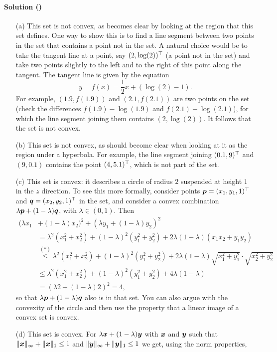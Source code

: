\documentclass{article}
\newcounter{problems}
\renewcommand{\solution}[1]{\paragraph{Solution (\theproblems)}\addtocounter{problems}{1}\label{#1}}
\begin{document}
\solution{so3} 
\begin{itemize}
 \item[(a)] This set is not convex, as becomes clear by looking at the region that this set defines. One way to show this is to find a line segment between two points in the set that contains a point not in the set. A natural choice would be to take the tangent line at a point, say $(2,\log(2))^{\top}$ (a point not in the set) and take two points slightly to the left and to the right of this point along the tangent. The tangent line is given by the equation
 \begin{equation*}
  y=f(x) = \frac{1}{2} x+(\log(2)-1).
 \end{equation*}
For example, $(1.9,f(1.9))$ and $(2.1,f(2.1))$ are two points on the set (check the differences $f(1.9)-\log(1.9)$ and $f(2.1)-\log(2.1)$), for which the line segment joining them contains $(2,\log(2))$. It follows that the set is not convex. 
 \item[(b)] This set is not convex, as should become clear when looking at it as the region under a hyperbola. For example, the line segment joining $(0.1,9)^{\top}$ and $(9,0.1)$ contains the point $(4,5.1)^{\top}$, which is not part of the set.
 \item[(c)] This set is convex: it describes a circle of radius $2$ suspended at height $1$ in the $z$ direction. To see this more formally, consider points $\bm{p}=(x_1,y_1,1)^{\top}$ and $\bm{q}=(x_2,y_2,1)^{\top}$ in the set, and consider a convex combination $\lambda \bm{p}+(1-\lambda)\bm{q}$, with $\lambda\in (0,1)$. Then
 \begin{align*}
  (\lambda x_1&+(1-\lambda)x_2)^2 + (\lambda y_1+(1-\lambda)y_2)^2\\ &=\lambda^2(x_1^2+x_2^2)+(1-\lambda)^2(y_1^2+y_2^2)+2\lambda (1-\lambda)(x_1x_2+y_1y_2)\\
  &\stackrel{(*)}{\leq} \lambda^2(x_1^2+x_2^2)+(1-\lambda)^2(y_1^2+y_2^2)+2\lambda (1-\lambda)\sqrt{x_1^2+y_1^2}\cdot \sqrt{x_2^2+y_2^2}\\
  &\leq \lambda^2(x_1^2+x_2^2)+(1-\lambda)^2(y_1^2+y_2^2)+4\lambda (1-\lambda)\\
  &= (\lambda 2+(1-\lambda)2)^2 = 4,
 \end{align*}
 so that $\lambda\bm{p}+(1-\lambda)\bm{q}$ also is in that set. You can also argue with the convexity of the circle and then use the property that a linear image of a convex set is convex.
 \item[(d)] This set is convex. For $\lambda \bm{x}+(1-\lambda)\bm{y}$ with $\bm{x}$ and $\bm{y}$ such that $\Vert {\bm{x}}\Vert_\infty+\Vert {\bm{x}}\Vert_1\leq 1$ and $\Vert {\bm{y}}\Vert_\infty+\Vert {\bm{y}}\Vert_1\leq 1$ we get, using the norm properties,

\end{itemize}
\end{document}
